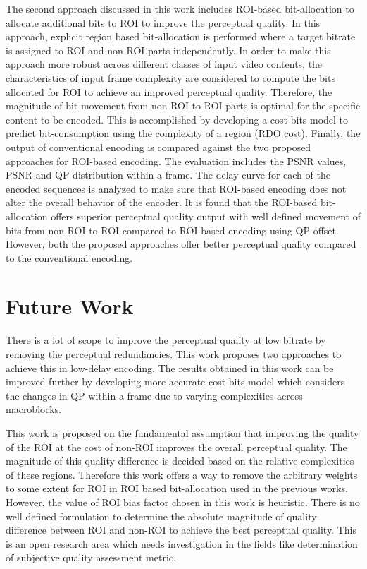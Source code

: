 The second approach discussed in this work includes ROI-based bit-allocation to allocate additional bits to ROI to improve the perceptual quality. In this approach, explicit region based bit-allocation is performed where a target bitrate is assigned to ROI and non-ROI parts independently. In order to make this approach more robust across different classes of input video contents, the characteristics of input frame complexity are considered to compute the bits allocated for ROI to achieve an improved perceptual quality. Therefore, the magnitude of bit movement from non-ROI to ROI parts is optimal for the specific content to be encoded. This is accomplished by developing a cost-bits model to predict bit-consumption using the complexity of a region (RDO cost). Finally, the output of conventional encoding is compared against the two proposed approaches for ROI-based encoding. The evaluation includes the PSNR values, PSNR and QP distribution within a frame. The delay curve for each of the encoded sequences is analyzed to make sure that ROI-based encoding does not alter the overall behavior of the encoder. It is found that the ROI-based bit-allocation offers superior perceptual quality output with well defined movement of bits from non-ROI to ROI compared to ROI-based encoding using QP offset. However, both the proposed approaches offer better perceptual quality compared to the conventional encoding.

\section{Future Work}
There is a lot of scope to improve the perceptual quality at low bitrate by removing the perceptual redundancies. This work proposes two approaches to achieve this in low-delay encoding. The results obtained in this work can be improved further by developing more accurate cost-bits model which considers the changes in QP within a frame due to varying complexities across macroblocks. 

This work is proposed on the fundamental assumption that improving the quality of the ROI at the cost of non-ROI improves the overall perceptual quality. The magnitude of this quality difference is decided based on the relative complexities of these regions. Therefore this work offers a way to remove the arbitrary weights to some extent for ROI in ROI based bit-allocation used in the previous works. However, the value of ROI bias factor chosen in this work is heuristic. There is no well defined formulation to determine the absolute magnitude of quality difference between ROI and non-ROI to achieve the best perceptual quality. This is an open research area which needs investigation in the fields like determination of subjective quality assessment metric.